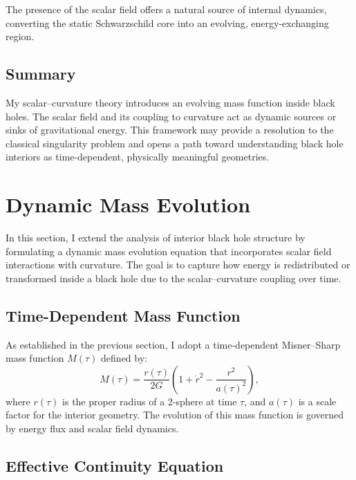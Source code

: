 \documentclass[12pt]{article}
\begin{document}
The presence of the scalar field offers a natural source of internal dynamics, converting the static Schwarzschild core into an evolving, energy-exchanging region.

\subsection{Summary}

My scalar--curvature theory introduces an evolving mass function inside black holes. The scalar field and its coupling to curvature act as dynamic sources or sinks of gravitational energy. This framework may provide a resolution to the classical singularity problem and opens a path toward understanding black hole interiors as time-dependent, physically meaningful geometries.

\section{Dynamic Mass Evolution}

In this section, I extend the analysis of interior black hole structure by formulating a dynamic mass evolution equation that incorporates scalar field interactions with curvature. The goal is to capture how energy is redistributed or transformed inside a black hole due to the scalar–curvature coupling over time.

\subsection{Time-Dependent Mass Function}

As established in the previous section, I adopt a time-dependent Misner–Sharp mass function \( M(\tau) \) defined by:
\begin{equation}
M(\tau) = \frac{r(\tau)}{2G} \left( 1 + \dot{r}^2 - \frac{r^2}{a(\tau)^2} \right),
\label{eq:mass_misner}
\end{equation}
where \( r(\tau) \) is the proper radius of a 2-sphere at time \( \tau \), and \( a(\tau) \) is a scale factor for the interior geometry. The evolution of this mass function is governed by energy flux and scalar field dynamics.

\subsection{Effective Continuity Equation}
\end{document}
